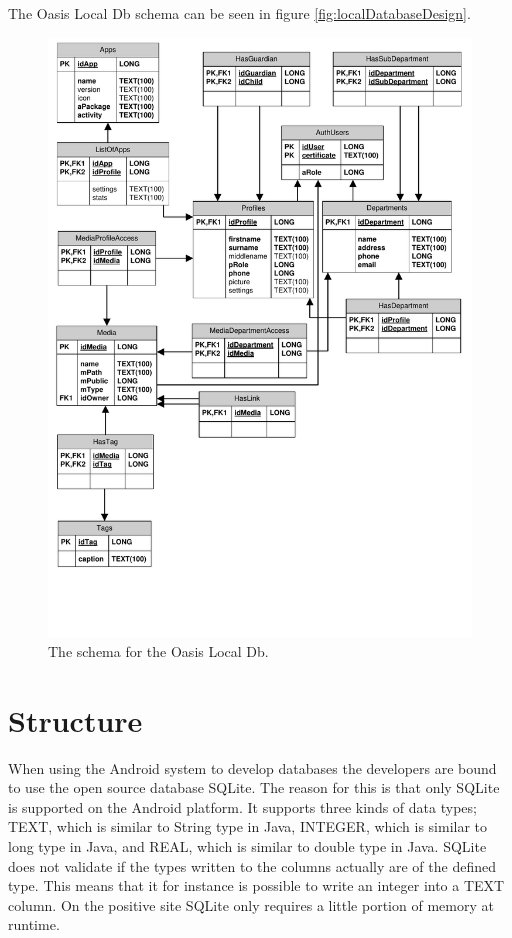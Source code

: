 The Oasis Local Db schema can be seen in figure \autoref{fig:localDatabaseDesign}.

\begin{figure}[htbp]
	\centering
		\includegraphics[width=\textwidth]{Images/LocalDatabaseDesign}
	\caption{The schema for the Oasis Local Db.}
	\label{fig:localDatabaseDesign}
\end{figure}

\section{Structure}
\label{sec:OasisStructure}
When using the Android system to develop databases the developers are bound to use the open source database SQLite. \cite{SQLite}
The reason for this is that only SQLite is supported on the Android platform. \cite{AndroidArchitecture}
It supports three kinds of data types; TEXT, which is similar to String type in Java, INTEGER, which is similar to long type in Java, and REAL, which is similar to double type in Java. \cite{SQLTypes}
SQLite does not validate if the types written to the columns actually are of the defined type.
This means that it for instance is possible to write an integer into a TEXT column.
On the positive site SQLite only requires a little portion of memory at runtime. \cite{SQLAbout} 

